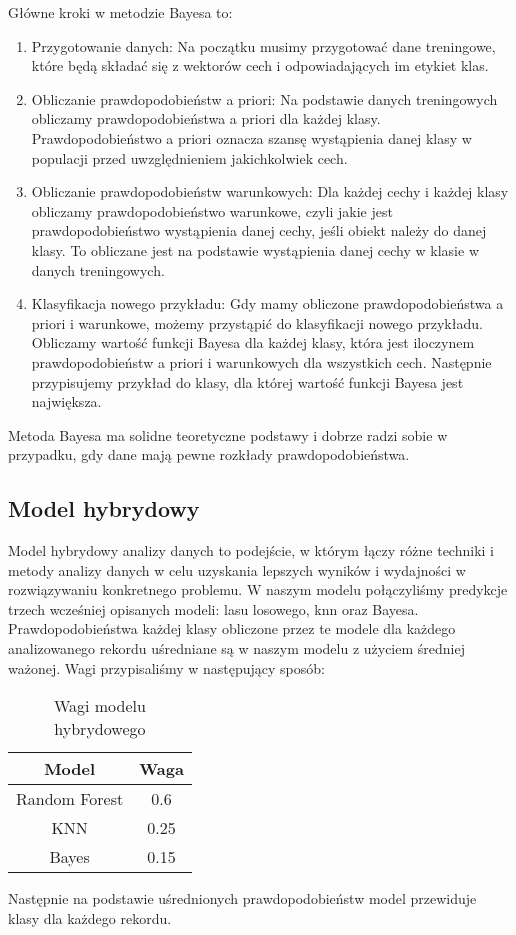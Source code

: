 \documentclass{article}
\begin{document}
Główne kroki w metodzie Bayesa to:
\begin{enumerate}
    \item Przygotowanie danych: Na początku musimy przygotować dane treningowe, które będą składać się z wektorów cech i odpowiadających im etykiet klas.
    \item Obliczanie prawdopodobieństw a priori: Na podstawie danych treningowych obliczamy prawdopodobieństwa a priori dla każdej klasy. Prawdopodobieństwo a priori oznacza szansę wystąpienia danej klasy w populacji przed uwzględnieniem jakichkolwiek cech.
    \item Obliczanie prawdopodobieństw warunkowych: Dla każdej cechy i każdej klasy obliczamy prawdopodobieństwo warunkowe, czyli jakie jest prawdopodobieństwo wystąpienia danej cechy, jeśli obiekt należy do danej klasy. To obliczane jest na podstawie wystąpienia danej cechy w klasie w danych treningowych.
    \item Klasyfikacja nowego przykładu: Gdy mamy obliczone prawdopodobieństwa a priori i warunkowe, możemy przystąpić do klasyfikacji nowego przykładu. Obliczamy wartość funkcji Bayesa dla każdej klasy, która jest iloczynem prawdopodobieństw a priori i warunkowych dla wszystkich cech. Następnie przypisujemy przykład do klasy, dla której wartość funkcji Bayesa jest największa.
\end{enumerate}
Metoda Bayesa ma solidne teoretyczne podstawy i dobrze radzi sobie w przypadku, gdy dane mają pewne rozkłady prawdopodobieństwa.
\subsection{Model hybrydowy}
Model hybrydowy analizy danych to podejście, w którym łączy różne techniki i metody analizy danych w celu uzyskania lepszych wyników i wydajności w rozwiązywaniu konkretnego problemu. \newline
W naszym modelu połączyliśmy predykcje trzech wcześniej opisanych modeli: lasu losowego, knn oraz Bayesa. Prawdopodobieństwa każdej klasy obliczone przez te modele dla każdego analizowanego rekordu uśredniane są w naszym modelu z użyciem średniej ważonej. Wagi przypisaliśmy w następujący sposób:

\begin{table}[H]
    \centering
    \begin{tabular}{|c|c|}
    \hline
    \textbf{Model} & \textbf{Waga} \\
    \hline
    Random Forest & 0.6 \\
    \hline
    KNN & 0.25 \\
    \hline
    Bayes & 0.15\\
    \hline
\end{tabular}
    \caption{Wagi modelu hybrydowego}
\end{table}
Następnie na podstawie uśrednionych prawdopodobieństw model przewiduje klasy dla każdego rekordu.
\end{document}
